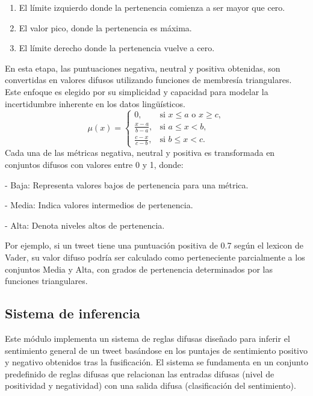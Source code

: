 \documentclass[sigconf, review=false, nonacm]{acmart}
\begin{document}
\begin{enumerate}
	\item El límite izquierdo donde la pertenencia comienza a ser mayor que cero.
	\item El valor pico, donde la pertenencia es máxima.
	\item El límite derecho donde la pertenencia vuelve a cero.
\end{enumerate}

En esta etapa, las puntuaciones negativa, neutral y positiva obtenidas, son convertidas en valores difusos
utilizando funciones de membresía triangulares. Este enfoque es elegido por su simplicidad y capacidad para
modelar la incertidumbre inherente en los datos lingüísticos.
$$
	\mu(x) =
	\begin{cases}
		0,                   & \text{si } x \leq a \text{ o } x \geq c, \\
		\frac{x - a}{b - a}, & \text{si } a \leq x < b,                 \\
		\frac{c - x}{c - b}, & \text{si } b \leq x < c.
	\end{cases}
$$
Cada una de las métricas negativa, neutral y positiva es transformada en conjuntos difusos con valores
entre 0 y 1, donde:

- Baja: Representa valores bajos de pertenencia para una métrica.

- Media: Indica valores intermedios de pertenencia.

- Alta: Denota niveles altos de pertenencia.

Por ejemplo, si un tweet tiene una puntuación positiva de 0.7 según el lexicon de Vader,
su valor difuso podría ser calculado como perteneciente parcialmente a los conjuntos Media y Alta,
con grados de pertenencia determinados por las funciones triangulares.

\subsection{Sistema de inferencia}
Este módulo implementa un sistema de reglas difusas diseñado para inferir el sentimiento general de un
tweet basándose en los puntajes de sentimiento positivo y negativo obtenidos tras la fusificación.
El sistema se fundamenta en un conjunto predefinido de reglas difusas que relacionan las entradas
difusas (nivel de positividad y negatividad) con una salida difusa (clasificación del sentimiento).
\end{document}
